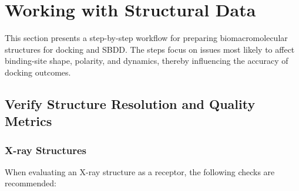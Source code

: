 \documentclass[12pt]{article}
\begin{document}
\section{Working with Structural Data}
This section presents a step-by-step workflow for preparing biomacromolecular structures for docking and SBDD. The steps focus on issues most likely to affect binding-site shape, polarity, and dynamics, thereby influencing the accuracy of docking outcomes.

\subsection{Verify Structure Resolution and Quality Metrics}

\subsubsection{X-ray Structures}
When evaluating an X-ray structure as a receptor, the following checks are recommended:
\end{document}

